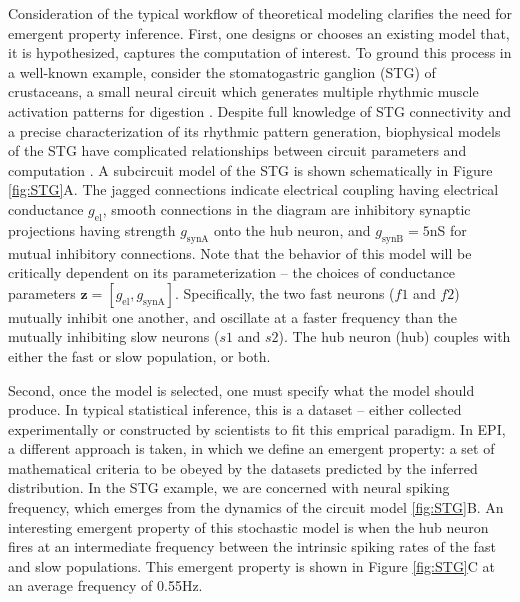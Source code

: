 \documentclass[11pt]{article}
\begin{document}
Consideration of the typical workflow of theoretical modeling clarifies the need for emergent property inference.  
First, one designs or chooses an existing model that, it is hypothesized, captures the computation of interest. 
To ground this process in a well-known example, consider the stomatogastric ganglion (STG) of crustaceans, a small neural circuit which generates multiple rhythmic muscle activation patterns for digestion \cite{marder2002cellular}.
Despite full knowledge of STG connectivity and a precise characterization of its rhythmic pattern generation, biophysical models of the STG have complicated relationships between circuit parameters and computation \cite{goldman2001global, prinz2004similar}.
A subcircuit model of the STG \cite{gutierrez2013multiple} is shown schematically in Figure \ref{fig:STG}A.
The jagged connections indicate electrical coupling having electrical conductance $g_{\text{el}}$, smooth connections in the diagram are inhibitory synaptic projections having strength $g_{\text{synA}}$ onto the hub neuron, and $g_{\text{synB}}=5$nS for mutual inhibitory connections.
Note that the behavior of this model will be critically dependent on its parameterization -- the choices of conductance parameters $\mathbf{z} = [g_{\text{el}}, g_{\text{synA}}]$.
Specifically, the two fast neurons ($f1$ and $f2$) mutually inhibit one another, and oscillate at a faster frequency than the mutually inhibiting slow neurons ($s1$ and $s2$).  
The hub neuron (hub) couples with either the fast or slow population, or both.  

Second, once the model is selected, one must specify what the model should produce.
In typical statistical inference, this is a dataset -- either collected experimentally or constructed by scientists to fit this emprical paradigm.
In EPI, a different approach is taken, in which we define an emergent property: a set of mathematical criteria to be obeyed by the datasets predicted by the inferred distribution.
In the STG example, we are concerned with neural spiking frequency, which emerges from the dynamics of the circuit model \ref{fig:STG}B.
An interesting emergent property of this stochastic model is when the hub neuron fires at an intermediate frequency between the intrinsic spiking rates of the fast and slow populations.
This emergent property is shown in Figure \ref{fig:STG}C at an average frequency of 0.55Hz.
\end{document}
